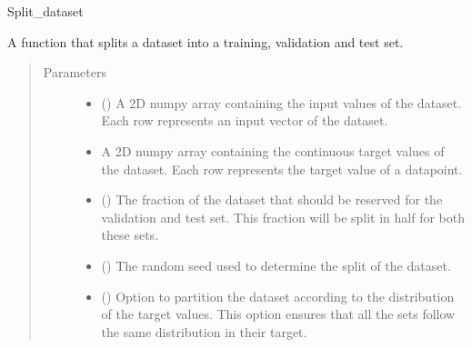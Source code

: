 \documentclass[letterpaper,10pt,english]{sphinxmanual}
\begin{document}
\begin{fulllineitems}
\label{\detokenize{modules/gqcml.datasets:gqcml.datasets.Datasets.split_dataset}}
Split\_dataset

A function that splits a dataset into a training, validation and test set.
\begin{quote}\begin{description}
\item[{Parameters}] \leavevmode\begin{itemize}
\item {} 
\sphinxstyleliteralstrong{\sphinxupquote{(}}\sphinxstyleliteralstrong{\sphinxupquote{)}} () \textendash{} A 2D numpy array containing the input values of the dataset. Each row represents an input vector of the dataset.

\item {} 
\sphinxstyleliteralstrong{\sphinxupquote{(}}\sphinxstyleliteralstrong{\sphinxupquote{)}} \textendash{} A 2D numpy array containing the continuous target values of the dataset.
Each row represents the target value of a datapoint.

\item {} 
\sphinxstyleliteralstrong{\sphinxupquote{(}}\sphinxstyleliteralstrong{\sphinxupquote{)}} () \textendash{} The fraction of the dataset that should be reserved for the validation and test set.
This fraction will be split in half for both these sets.

\item {} 
\sphinxstyleliteralstrong{\sphinxupquote{(}}\sphinxstyleliteralstrong{\sphinxupquote{)}} () \textendash{} The random seed used to determine the split of the dataset.

\item {} 
\sphinxstyleliteralstrong{\sphinxupquote{ (}}\sphinxstyleliteralstrong{\sphinxupquote{)}} (\sphinxstyleliteralemphasis{\sphinxupquote{(}}\sphinxstyleliteralemphasis{\sphinxupquote{)}}) \textendash{} Option to partition the dataset according to the distribution of the target values. This option
ensures that all the sets follow the same distribution in their target.


\end{itemize}
\end{description}
\end{quote}
\end{fulllineitems}
\end{document}

